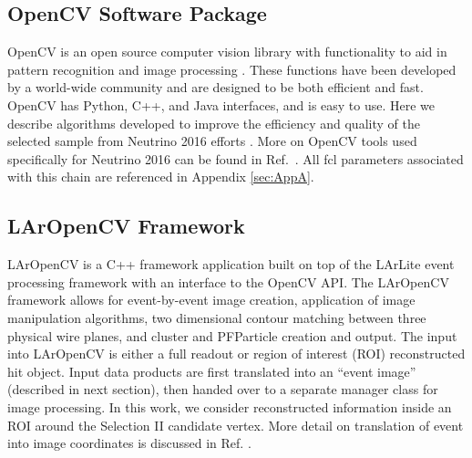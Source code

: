 \subsection{OpenCV Software Package}
OpenCV is an open source computer vision library with functionality to aid in pattern recognition and image processing \cite{bib:opencv}. These functions have been developed by a world-wide community and are designed to be both efficient and fast. OpenCV has Python, C++, and Java interfaces, and is easy to use. Here we describe algorithms developed to improve the efficiency and quality of the selected sample from Neutrino 2016 efforts \cite{bib:5864}. More on OpenCV tools used specifically for Neutrino 2016 can be found in Ref.~\cite{bib:5856}.  All fcl parameters associated with this chain are referenced in Appendix \ref{sec:AppA}.

\subsection{LArOpenCV Framework}
LArOpenCV is a C++ framework application built on top of the LArLite event processing framework with an interface to the OpenCV API. The LArOpenCV framework allows for event-by-event image creation, application of image manipulation algorithms, two dimensional contour matching between three physical wire planes, and cluster and PFParticle creation and output. The input into LArOpenCV is either a full readout or region of interest (ROI) reconstructed hit object. Input data products are first translated into an ``event image'' (described in next section), then handed over to a separate manager class for image processing. In this work, we consider reconstructed information inside an ROI around the Selection II candidate vertex.  More detail on translation of event into image coordinates is discussed in Ref. \cite{bib:5856}.


